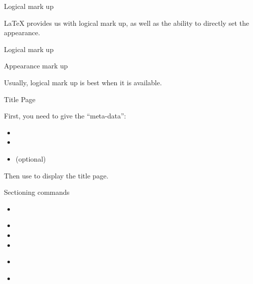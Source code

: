 \begin{frame}[fragile]{Logical mark up}

  \LaTeX{} provides us with logical mark up, as well as the ability to
  directly set the appearance. 
  \begin{block}{Logical mark up}
      \\
  \end{block}
  \begin{block}{Appearance mark up}
      \\
  \end{block}
  Usually, logical mark up is best when it is available.

\end{frame}

\begin{frame}{Title Page}

  First, you need to give the \enquote{meta-data}:
  \begin{itemize}
    \item {}
    \item {}
    \item {} (optional)
  \end{itemize}
   Then use  to display the title page.
   
\end{frame}

\begin{frame}{Sectioning commands}

  \begin{itemize}
    \item 
      \alert<2>{}
    \item {}
    \item {}
    \item {}
    \item 
      \alert<3>{}
    \item {}
  \end{itemize}
  
\end{frame}

